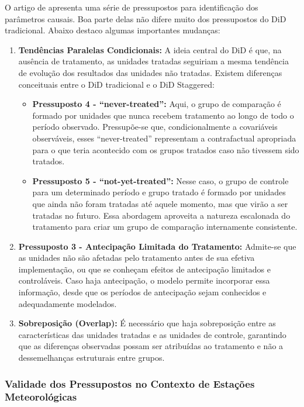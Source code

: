 \documentclass[
	12pt,				%
	oneside,			%
	a4paper,			%
	english,			%
	french,				%
	spanish,			%
	brazil				%
	]{abntex2}
\begin{document}
O artigo de  apresenta uma série de pressupostos para identificação dos parâmetros causais. Boa parte delas não difere muito dos pressupostos do DiD tradicional. Abaixo destaco algumas importantes mudanças:

\begin{enumerate}
\item \textbf{Tendências Paralelas Condicionais:} A ideia central do DiD é que, na ausência de tratamento, as unidades tratadas seguiriam a mesma tendência de evolução dos resultados das unidades não tratadas. Existem diferenças conceituais entre o DiD tradicional e o DiD Staggered:
   \begin{itemize}
   \item \textbf{Pressuposto 4 - ``never-treated'':} Aqui, o grupo de comparação é formado por unidades que nunca recebem tratamento ao longo de todo o período observado. Pressupõe-se que, condicionalmente a covariáveis observáveis, esses ``never-treated'' representam a contrafactual apropriada para o que teria acontecido com os grupos tratados caso não tivessem sido tratados.
   \item \textbf{Pressuposto 5 - ``not-yet-treated'':} Nesse caso, o grupo de controle para um determinado período e grupo tratado é formado por unidades que ainda não foram tratadas até aquele momento, mas que virão a ser tratadas no futuro. Essa abordagem aproveita a natureza escalonada do tratamento para criar um grupo de comparação internamente consistente.
   \end{itemize}

\item \textbf{Pressuposto 3 - Antecipação Limitada do Tratamento:} Admite-se que as unidades não são afetadas pelo tratamento antes de sua efetiva implementação, ou que se conheçam efeitos de antecipação limitados e controláveis. Caso haja antecipação, o modelo permite incorporar essa informação, desde que os períodos de antecipação sejam conhecidos e adequadamente modelados.

\item \textbf{Sobreposição (Overlap):} É necessário que haja sobreposição entre as características das unidades tratadas e as unidades de controle, garantindo que as diferenças observadas possam ser atribuídas ao tratamento e não a dessemelhanças estruturais entre grupos.
\end{enumerate}

\subsubsection{Validade dos Pressupostos no Contexto de Estações Meteorológicas}
\end{document}
